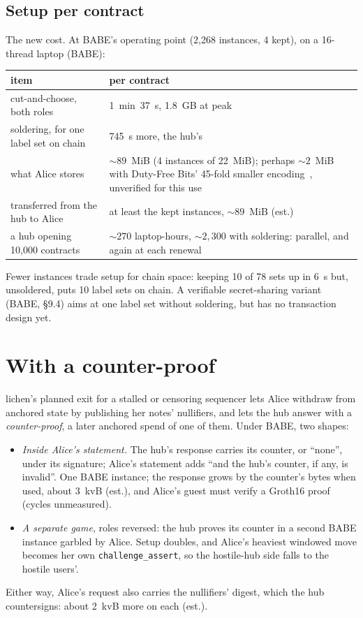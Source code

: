 \documentclass[11pt]{article}
\newcommand{\tx}[1]{\texttt{#1}}
\begin{document}
\subsection{Setup per contract}
\label{sec:setup}

The new cost. At BABE's operating point (2,268 instances, 4 kept), on a
16-thread laptop (BABE):
\begin{center}
\small
\begin{tabularx}{\linewidth}{>{\raggedright\arraybackslash}p{60mm}L}
\toprule
item & per contract \\
\midrule
cut-and-choose, both roles & 1~min~37~s, 1.8~GB at peak \\
soldering, for one label set on chain & 745~s more, the hub's \\
what Alice stores & ${\sim}89$~MiB (4 instances of 22~MiB); perhaps ${\sim}2$~MiB with Duty-Free Bits' 45-fold smaller encoding~\cite{dutyfree}, unverified for this use \\
transferred from the hub to Alice & at least the kept instances, ${\sim}89$~MiB (est.) \\
a hub opening 10,000 contracts & ${\sim}270$ laptop-hours, ${\sim}2{,}300$ with soldering: parallel, and again at each renewal \\
\bottomrule
\end{tabularx}
\end{center}
Fewer instances trade setup for chain space: keeping 10 of 78 sets up in
6~s but, unsoldered, puts 10 label sets on chain. A verifiable
secret-sharing variant (BABE, §9.4) aims at one label set without
soldering, but has no transaction design yet.

\section{With a counter-proof}
\label{sec:counter}

lichen's planned exit for a stalled or censoring sequencer lets Alice
withdraw from anchored state by publishing her notes' nullifiers, and
lets the hub answer with a \emph{counter-proof}, a later anchored spend
of one of them. Under BABE, two shapes:
\begin{itemize}[leftmargin=1.5em]
\item \emph{Inside Alice's statement.} The hub's response carries its
  counter, or ``none'', under its signature; Alice's statement adds
  ``and the hub's counter, if any, is invalid''. One BABE instance; the
  response grows by the counter's bytes when used, about 3~kvB (est.),
  and Alice's guest must verify a Groth16 proof (cycles unmeasured).
\item \emph{A separate game}, roles reversed: the hub proves its counter
  in a second BABE instance garbled by Alice. Setup doubles, and Alice's
  heaviest windowed move becomes her own \tx{challenge\_assert}, so the
  hostile-hub side falls to the hostile users'.
\end{itemize}
Either way, Alice's request also carries the nullifiers' digest, which
the hub countersigns: about 2~kvB more on each (est.).
\end{document}
